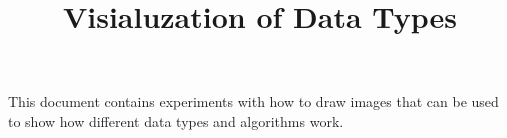 \documentclass{scrartcl}
\begin{document}
  \title{Visialuzation of Data Types}
  \maketitle

  This document contains experiments with how to draw images that
  can be used to show how different data types and algorithms work.

  
  
\end{document}
